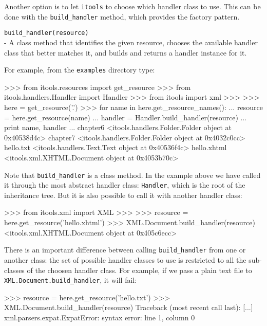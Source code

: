 Another option is to let {\tt itools} to choose which handler class to use.
This can be done with the {\tt build\_handler} method, which provides the
factory pattern.

\begin{api}
  {\tt build\_handler(resource)}\\
  - A class method that identifies the given resource, chooses the available
  handler class that better matches it, and builds and returns a handler
  instance for it.
\end{api}

For example, from the {\tt examples} directory type:

\begin{code}
    >>> from itools.resources import get_resource
    >>> from itools.handlers.Handler import Handler
    >>> from itools import xml
    >>> 
    >>> here = get_resource('.')
    >>> for name in here.get_resource_names():
    ...     resource = here.get_resource(name)
    ...     handler = Handler.build_handler(resource)
    ...     print name, handler
    ... 
    chapter6 <itools.handlers.Folder.Folder object at 0x40538d4c>
    chapter7 <itools.handlers.Folder.Folder object at 0x4032c0cc>
    hello.txt <itools.handlers.Text.Text object at 0x40536f4c>
    hello.xhtml <itools.xml.XHTML.Document object at 0x4053b70c>
\end{code}

Note that {\tt build\_handler} is a class method. In the example above
we have called it through the most abstract handler class: {\tt Handler},
which is the root of the inheritance tree. But it is also possible to call
it with another handler class:

\begin{code}
    >>> from itools.xml import XML
    >>> 
    >>> resource = here.get_resource('hello.xhtml')
    >>> XML.Document.build_handler(resource)
    <itools.xml.XHTML.Document object at 0x405c6ecc>
\end{code}

There is an important difference between calling {\tt build\_handler} from
one or another class: the set of possible handler classes to use is
restricted to all the sub-classes of the choosen handler class. For example,
if we pass a plain text file to {\tt XML.Document.build\_handler}, it will
fail:

\begin{code}
    >>> resource = here.get_resource('hello.txt')
    >>> XML.Document.build_handler(resource)
    Traceback (most recent call last):
      [...]
    xml.parsers.expat.ExpatError: syntax error: line 1, column 0
\end{code}



